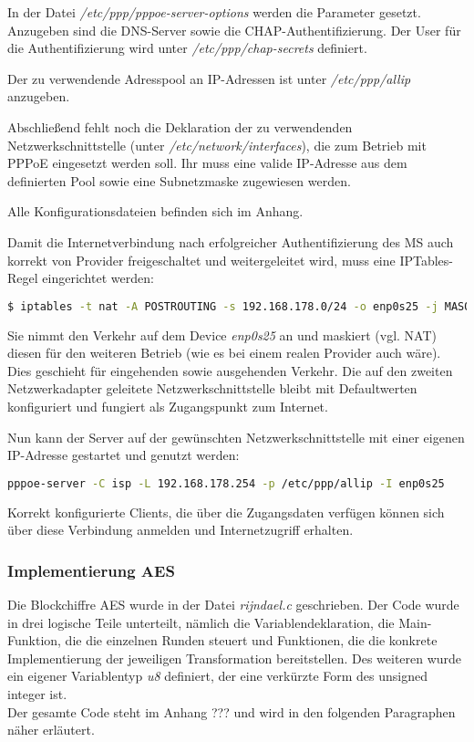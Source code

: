     	In der Datei \textit{/etc/ppp/pppoe-server-options} werden die Parameter gesetzt. Anzugeben
    	sind die DNS-Server sowie die CHAP-Authentifizierung. Der User für die Authentifizierung
    	wird unter \textit{/etc/ppp/chap-secrets} definiert.

    	Der zu verwendende Adresspool an IP-Adressen ist unter \textit{/etc/ppp/allip} anzugeben.

    	Abschließend fehlt noch die Deklaration der zu verwendenden Netzwerkschnittstelle (unter \textit{/etc/network/interfaces}),
    	die zum Betrieb mit PPPoE eingesetzt werden soll. Ihr muss eine valide IP-Adresse aus dem definierten
    	Pool sowie eine Subnetzmaske zugewiesen werden.

    	Alle Konfigurationsdateien befinden sich im Anhang. %

    	Damit die Internetverbindung nach erfolgreicher Authentifizierung des \ac{MS} auch
    	korrekt von Provider freigeschaltet und weitergeleitet wird, muss eine IPTables-Regel
    	eingerichtet werden:

    	\begin{lstlisting}[language=bash]
		$ iptables -t nat -A POSTROUTING -s 192.168.178.0/24 -o enp0s25 -j MASQUERADE
	\end{lstlisting}

	Sie nimmt den Verkehr auf dem Device \textit{enp0s25} an und maskiert (vgl. \ac{NAT}) diesen
	für den weiteren Betrieb (wie es bei einem realen Provider auch wäre). Dies geschieht
	für eingehenden sowie ausgehenden Verkehr. Die auf den zweiten Netzwerkadapter geleitete
	Netzwerkschnittstelle bleibt mit Defaultwerten konfiguriert und fungiert als Zugangspunkt
	zum Internet.

	Nun kann der Server auf der gewünschten Netzwerkschnittstelle mit einer eigenen IP-Adresse
	gestartet und genutzt werden:
	\begin{lstlisting}[language=bash]
		pppoe-server -C isp -L 192.168.178.254 -p /etc/ppp/allip -I enp0s25
	\end{lstlisting}

        Korrekt konfigurierte Clients, die über die Zugangsdaten verfügen können sich über
        diese Verbindung anmelden und Internetzugriff erhalten.

	\subsubsection{Implementierung AES}
	\label{implementierung-aes}
	Die Blockchiffre AES wurde in der Datei \emph{rijndael.c} geschrieben. Der Code wurde in drei
	logische Teile unterteilt, nämlich die Variablen\-deklaration, die Main-Funktion, die die
	einzelnen Runden steuert und Funktionen, die die konkrete Implementierung der jeweiligen
	Transformation bereitstellen. Des weiteren wurde ein eigener Variablentyp \emph{u8} definiert,
	der eine verkürzte Form des unsigned integer ist. \\
	Der gesamte Code steht im Anhang ??? und wird in den folgenden Paragraphen näher erläutert.

